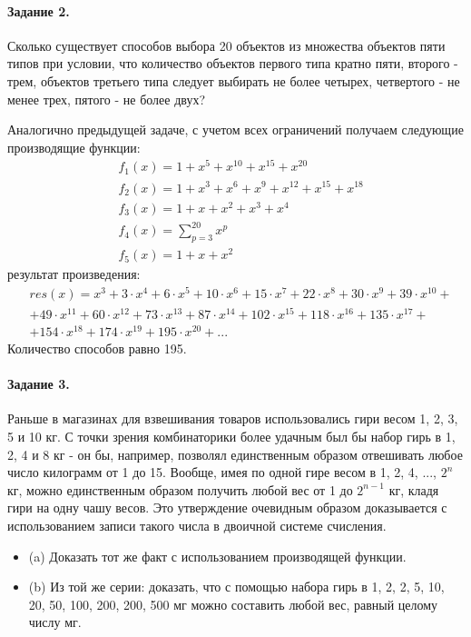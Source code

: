 \documentclass[a4paper,12pt]{article}
\begin{document}
\paragraph{Задание 2.} Сколько существует способов выбора 20 объектов из множества объектов пяти типов при условии, что количество объектов первого типа кратно пяти, второго - трем, объектов третьего типа следует выбирать не более четырех, четвертого - не менее трех, пятого - не более двух?

\begin{Solution}
Аналогично предыдущей задаче, с учетом всех ограничений получаем следующие производящие функции:
\[
	\begin{split}
		&f_1\left(x\right)=1+x^5+x^{10}+x^{15}+x^{20}\\
		&f_2\left(x\right)=1+x^3+x^6+x^9+x^{12}+x^{15}+x^{18}\\
		&f_3\left(x\right)=1+x+x^2+x^3+x^4\\
		&f_4\left(x\right)=\sum_{p=3}^{20} x^p\\
		&f_5\left(x\right)=1+x+x^2
	\end{split}
\]
результат произведения:
\[
	\begin{split}
		&res\left(x\right)=x^3+3\cdot x^4+6\cdot x^5+10\cdot x^6+15\cdot x^7+22\cdot x^8+30\cdot x^9+39\cdot x^{10}+\\
		&+49\cdot x^{11}+60\cdot x^{12}+73\cdot x^{13}+87\cdot x^{14}+102\cdot x^{15}+118\cdot x^{16}+135\cdot x^{17}+\\
		&+154\cdot x^{18}+174\cdot x^{19}+195\cdot x^{20}+...
	\end{split}
\]
Количество способов равно 195.
\end{Solution}

\paragraph{Задание 3.} Раньше в магазинах для взвешивания товаров использовались гири весом 1, 2, 3, 5 и 10 кг. С точки зрения комбинаторики более удачным был бы набор гирь в 1, 2, 4 и 8 кг - он бы, например, позволял единственным образом отвешивать любое число килограмм от 1 до 15. Вообще, имея по одной гире весом в 1, 2, 4, ..., $2^n$ кг, можно единственным образом получить любой вес от 1 до $2^{n-1}$ кг, кладя гири на одну чашу весов. Это утверждение очевидным образом доказывается с использованием записи такого числа в двоичной системе счисления.

\begin{itemize}
\item (a) Доказать тот же факт с использованием производящей функции.

\item (b) Из той же серии: доказать, что с помощью набора гирь в 1, 2, 2, 5, 10, 20, 50, 100, 200, 200, 500 мг можно составить любой вес, равный целому числу мг.
\end{itemize}
\end{document}
